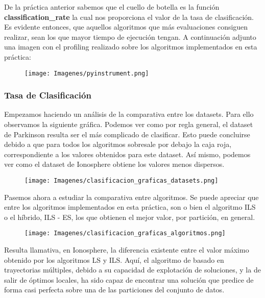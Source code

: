 \documentclass[10pt, a4paper]{article}
\theoremstyle{theorem-style}
\theoremstyle{theorem-style}
\theoremstyle{theorem2-style}
\theoremstyle{definition-style}
\theoremstyle{remark-style}
\theoremstyle{example-style}
\theoremstyle{definition-style}
\theoremstyle{remark-style}
\theoremstyle{remark-style}
\begin{document}
De la práctica anterior sabemos que el cuello de botella es la función \textbf{classification\_rate} la cual nos proporciona el valor de la tasa de clasificación. Es evidente entonces, que aquellos algoritmos que más evaluaciones consiguen realizar, sean los que mayor tiempo de ejecución tengan. A continuación adjunto una imagen con el profiling realizado sobre los algoritmos implementados en esta práctica: 

\begin{figure}[htp]
\centering
\texttt{[image: Imagenes/pyinstrument.png]}
\label{}
\end{figure}

\subsubsection{Tasa de Clasificación}

Empezamos haciendo un análisis de la comparativa entre los datasets. Para ello observamos la siguiente gráfica. Podemos ver como por regla general, el dataset de Parkinson resulta ser el más complicado de clasificar. Esto puede concluirse debido a que para todos los algoritmos sobresale por debajo la caja roja, correspondiente a los valores obtenidos para este dataset. Así mismo, podemos ver como el dataset de Ionosphere obtiene los valores menos dispersos. 

\pagebreak
\begin{figure}[htp]
\centering
\texttt{[image: Imagenes/clasificacion\_graficas\_datasets.png]}
\label{}
\end{figure}

Pasemos ahora a estudiar la comparativa entre algoritmos. Se puede apreciar que entre los algoritmos implementados en esta práctica, son o bien el algoritmo ILS o el híbrido, ILS - ES, los que obtienen el mejor valor, por partición, en general. 

\begin{figure}[htp]
\centering
\texttt{[image: Imagenes/clasificacion\_graficas\_algoritmos.png]}
\label{}
\end{figure}

Resulta llamativa, en Ionosphere, la diferencia existente entre el valor máximo obtenido por los algoritmos LS y ILS. Aquí, el algoritmo de basado en trayectorias múltiples, debido a su capacidad de explotación de soluciones, y la de salir de óptimos locales, ha sido capaz de encontrar una solución que predice de forma casi perfecta sobre una de las particiones del conjunto de datos. 
\end{document}
